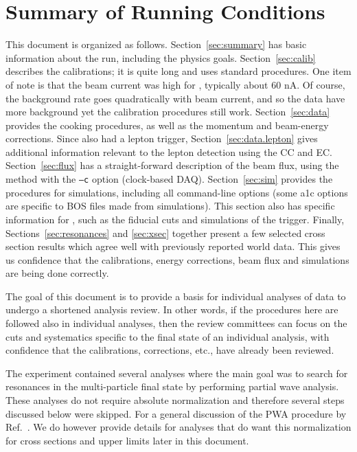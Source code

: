 \section{\label{sec:summary}Summary of Running Conditions}

This document is organized as follows. Section~\ref{sec:summary} has basic information about the  run, including the physics goals. Section~\ref{sec:calib} describes the calibrations; it is quite long and uses standard  procedures. One item of note is that the beam current was high for , typically about 60 nA. Of course, the background rate goes quadratically with beam current, and so the  data have more background yet the calibration procedures still work. Section~\ref{sec:data} provides the cooking procedures, as well as the momentum and beam-energy corrections. Since  also had a lepton trigger, Section~\ref{sec:data.lepton} gives additional information relevant to the lepton detection using the CC and EC. Section~\ref{sec:flux} has a straight-forward description of the beam flux, using the  method with the \verb+–c+ option (clock-based DAQ). Section~\ref{sec:sim} provides the procedures for simulations, including all command-line options (some a1c options are specific to BOS files made from simulations). This section also has specific information for , such as the fiducial cuts and simulations of the  trigger. Finally, Sections~\ref{sec:resonances} and \ref{sec:xsec} together present a few selected cross section results which agree well with previously reported world data. This gives us confidence that the calibrations, energy corrections, beam flux and simulations are being done correctly.

The goal of this document is to provide a basis for individual analyses of  data to undergo a shortened analysis review. In other words, if the procedures here are followed also in individual analyses, then the review committees can focus on the cuts and systematics specific to the final state of an individual analysis, with confidence that the calibrations, corrections, etc., have already been reviewed.

The  experiment contained several analyses where the main goal was to search for resonances in the multi-particle final state by performing partial wave analysis. These analyses\cite{clas.thesis.bookwalter, clas.thesis.schott} do not require absolute normalization and therefore several steps discussed below were skipped. For a general discussion of the PWA procedure by  Ref.~\cite{pwa.salgado2014}. We do however provide details for analyses that do want this normalization for cross sections and upper limits later in this document.

